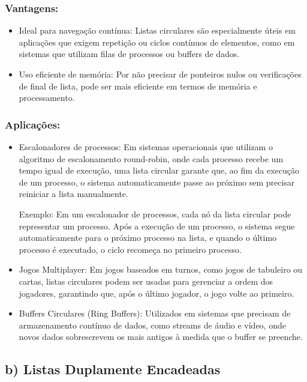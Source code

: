 \documentclass{article}
\begin{document}
\subsubsection{Vantagens:}
\begin{itemize}
    \item Ideal para navegação contínua: Listas circulares são especialmente úteis em aplicações que exigem repetição ou ciclos contínuos de elementos, como em sistemas que utilizam filas de processos ou buffers de dados.
    \item Uso eficiente de memória: Por não precisar de ponteiros nulos ou verificações de final de lista, pode ser mais eficiente em termos de memória e processamento.
\end{itemize}

\subsubsection{Aplicações:}
\begin{itemize}
    \item Escalonadores de processos: Em sistemas operacionais que utilizam o algoritmo de escalonamento round-robin, onde cada processo recebe um tempo igual de execução, uma lista circular garante que, ao fim da execução de um processo, o sistema automaticamente passe ao próximo sem precisar reiniciar a lista manualmente.

    Exemplo: Em um escalonador de processos, cada nó da lista circular pode representar um processo. Após a execução de um processo, o sistema segue automaticamente para o próximo processo na lista, e quando o último processo é executado, o ciclo recomeça no primeiro processo.
    
    \item Jogos Multiplayer: Em jogos baseados em turnos, como jogos de tabuleiro ou cartas, listas circulares podem ser usadas para gerenciar a ordem dos jogadores, garantindo que, após o último jogador, o jogo volte ao primeiro.
    
    \item Buffers Circulares (Ring Buffers): Utilizados em sistemas que precisam de armazenamento contínuo de dados, como streams de áudio e vídeo, onde novos dados sobrescrevem os mais antigos à medida que o buffer se preenche.
\end{itemize}

\subsection*{b) Listas Duplamente Encadeadas}
\end{document}
